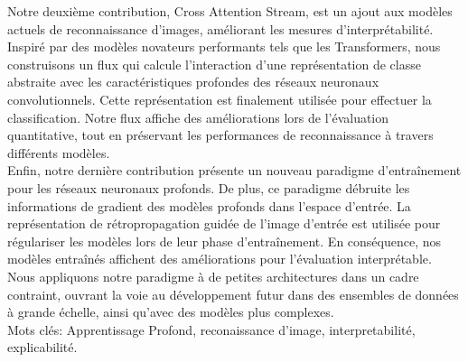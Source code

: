 \noindent Notre deuxième contribution, Cross Attention Stream, est un ajout aux modèles actuels de 
reconnaissance d'images, améliorant les mesures d'interprétabilité. Inspiré par des modèles 
novateurs performants tels que les Transformers, nous construisons un flux qui calcule l'interaction 
d'une représentation de classe abstraite avec les caractéristiques profondes des réseaux neuronaux 
convolutionnels. Cette représentation est finalement utilisée pour effectuer la classification. 
Notre flux affiche des améliorations lors de l'évaluation quantitative, tout en préservant les 
performances de reconnaissance à travers différents modèles.\\

\noindent Enfin, notre dernière contribution présente un nouveau paradigme d'entraînement pour les 
réseaux neuronaux profonds. De plus, ce paradigme débruite les informations de gradient des modèles 
profonds dans l'espace d'entrée. La représentation de rétropropagation guidée de l'image d'entrée 
est utilisée pour régulariser les modèles lors de leur phase d'entraînement. En conséquence, nos 
modèles entraînés affichent des améliorations pour l'évaluation interprétable. Nous appliquons 
notre paradigme à de petites architectures dans un cadre contraint, ouvrant la voie au 
développement futur dans des ensembles de données à grande échelle, ainsi qu'avec des modèles plus 
complexes.\\

\vspace{0.5cm}
Mots clés: Apprentissage Profond, reconaissance d'image, interpretabilité, explicabilité.
